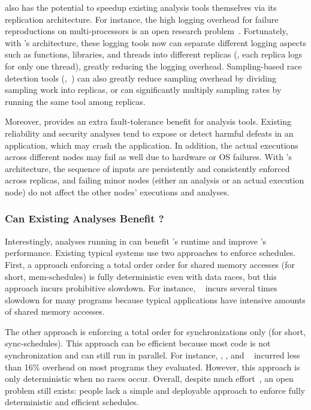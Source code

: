 \xxx also has the potential to speedup existing analysis tools themselves via 
its replication architecture. For instance, the high logging overhead for 
failure reproductions on multi-processors is an open research 
problem~\cite{sherlog:asplos10}. Fortunately, with \xxx's architecture, these 
logging tools now can separate different logging aspects such as functions, 
libraries, and threads into different replicas (\eg, each replica logs for only 
one thread), greatly reducing the logging overhead. Sampling-based race 
detection tools (\eg,~\cite{datacollider:osdi10}) can also greatly reduce 
sampling overhead by dividing sampling work into replicas, or can significantly 
multiply sampling rates by running the same tool among replicas.

Moreover, \xxx provides an extra fault-tolerance benefit for analysis tools. 
Existing reliability and security analyses tend to expose or detect harmful 
defeats in an application, which may crash the application. In addition, the 
actual executions across different nodes may fail as well due to hardware or OS 
failures. With \xxx's \smr architecture, the sequence of inputs are 
persistently and consistently enforced across replicas, and failing minor 
nodes (either an analysis or an actual execution node) do not affect the other 
nodes' executions and analyses.

% 

\subsubsection{Can Existing Analyses Benefit \xxx?} 
\label{sec:strengthen-crane}

Interestingly, analyses running in \xxx can benefit \xxx's \dmt runtime and 
improve \xxx's performance. Existing typical \dmt systems use two approaches to 
enforce schedules. First, a \dmt approach enforcing a total order order for 
shared memory accesses (for short, mem-schedules) is fully deterministic even 
with data races, but this approach incurs prohibitive slowdown. For instance, 
\dthreads~\cite{dthreads:sosp11} incurs several times slowdown for many 
programs because typical applications have intensive amounts of shared memory 
accesses.

The other \dmt approach is enforcing a total order for 
synchronizations only (for short, sync-schedules). This approach can be 
efficient because most code is not synchronization and can still run in 
parallel. For instance, \kendo, \tern, and \peregrine~\cite{kendo:asplos09, 
cui:tern:osdi10, parrot:sosp13} incurred less than 16\% overhead on most 
programs they evaluated. However, this approach is only deterministic when 
no races occur. Overall, despite much effort~\cite{dthreads:sosp11, 
parrot:sosp13, peregrine:sosp11, determinator:osdi10}, an open problem still 
exists: people lack a simple and deployable approach to enforce fully 
deterministic and efficient \dmt schedules.



